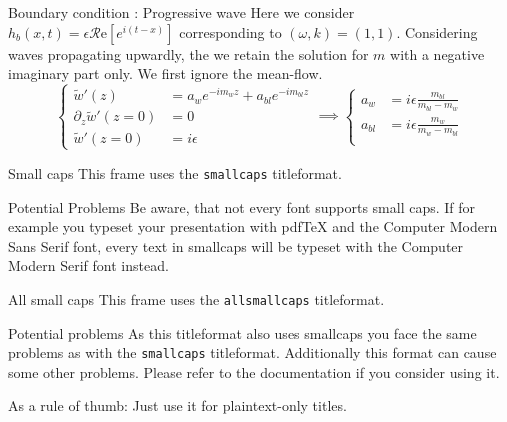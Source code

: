 \documentclass[10pt]{beamer}
\begin{document}
\begin{frame}{Boundary condition : Progressive wave}
	Here we consider $h_{b}\left(x,t\right)=\epsilon\mathcal{R}\mathrm{e}\left[e^{i\left(t-x\right)}\right]$ corresponding to $\left(\omega,k\right)=\left(1,1\right)$. Considering waves propagating upwardly, the we retain the solution for $m$ with a negative imaginary part only. We first ignore the mean\--flow. 
	\begin{equation*}
		\begin{cases}
			\tilde{w}'\left(z\right)&=a_{w}e^{-im_{w}z}+a_{bl}e^{-im_{bl}z}\\
			\partial_{z}\tilde{w}'\left(z=0\right)&=0\\
			\tilde{w}'\left(z=0\right)&=i\epsilon
		\end{cases}
		\implies 
		\begin{cases}
		a_{w}&=i\epsilon\frac{m_{bl}}{m_{bl}-m_{w}}\\
		a_{bl}&=i\epsilon\frac{m_{w}}{m_{w}-m_{bl}}\\
		\end{cases}
	\end{equation*}
\end{frame}

{
\begin{frame}{Small caps}
	This frame uses the \texttt{smallcaps} titleformat.

	\begin{alertblock}{Potential Problems}
		Be aware, that not every font supports small caps. If for example you typeset your presentation with pdfTeX and the Computer Modern Sans Serif font, every text in smallcaps will be typeset with the Computer Modern Serif font instead.
	\end{alertblock}
\end{frame}
}

{
\begin{frame}{All small caps}
	This frame uses the \texttt{allsmallcaps} titleformat.

	\begin{alertblock}{Potential problems}
		As this titleformat also uses smallcaps you face the same problems as with the \texttt{smallcaps} titleformat. Additionally this format can cause some other problems. Please refer to the documentation if you consider using it.

		As a rule of thumb: Just use it for plaintext-only titles.
	\end{alertblock}
\end{frame}
}
\end{document}
